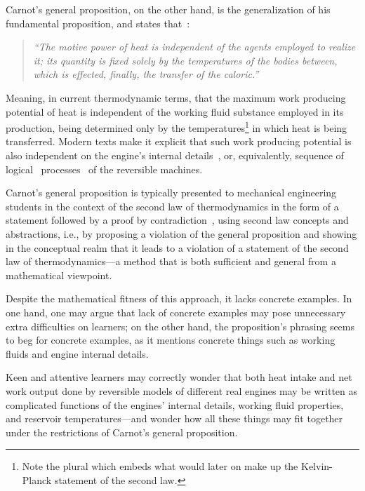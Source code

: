     Carnot's general proposition, on the other hand, is the generalization  of  his  fundamental
    proposition, and states that~\cite[p.~68]{1897-ThurstonRH-Wiley}:

    \begin{quote}
        \it
        ``The motive power of heat is independent of the agents employed
        to realize it; its quantity is fixed solely by the  temperatures
        of the bodies between, which is effected, finally, the  transfer
        of the caloric.''
    \end{quote}

    Meaning, in current thermodynamic terms, that the maximum work producing potential  of  heat
    is independent of the working fluid substance employed in its production,  being  determined
    only by the temperatures\footnote{Note the plural which embeds what would later on  make  up
    the Kelvin-Planck statement of the second law.} in which heat is  being  transferred.  Modern
    texts make it explicit that such  work  producing  potential  is  also  independent  on  the
    engine's internal details~\cite{2013-CengelYA+BolesMA-AMGH}, or, equivalently,  sequence  of
    logical~\cite{2020-NaaktgeborenC-engrXiv} processes~\cite{2002-MoranMJ+ShapiroHN-LTC} of the
    reversible machines.

    Carnot's general proposition is typically presented to mechanical  engineering  students  in
    the context of the second law of thermodynamics in the form of a  statement  followed  by  a
    proof   by    contradiction~\cite{2013-CengelYA+BolesMA-AMGH,    2002-MoranMJ+ShapiroHN-LTC,
    1986-JonesJB+HawkinsGA-Wiley},  using  second  law  concepts  and  abstractions,  i.e.,   by
    proposing a violation of the general proposition and showing in the conceptual realm that it
    leads to a violation of a statement of the second law of thermodynamics---a method  that  is
    both sufficient and general from a mathematical viewpoint.

    Despite the mathematical fitness of this approach, it lacks concrete examples. In one  hand,
    one may argue that lack of concrete examples may  pose  unnecessary  extra  difficulties  on
    learners; on the other hand, the proposition's phrasing seems to beg for concrete  examples,
    as it mentions concrete things such as working fluids and engine internal details.

    Keen and attentive learners may correctly wonder that both heat intake and net  work  output
    done by reversible models of different real engines may be written as complicated  functions
    of the engines' internal details, working fluid properties, and reservoir temperatures---and
    wonder how all these things may fit together under  the  restrictions  of  Carnot's  general
    proposition.

